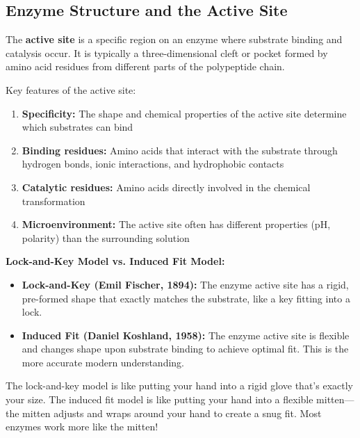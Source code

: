 \subsection{Enzyme Structure and the Active Site}

\begin{definition}
The \textbf{active site} is a specific region on an enzyme where substrate binding and catalysis occur. It is typically a three-dimensional cleft or pocket formed by amino acid residues from different parts of the polypeptide chain.
\end{definition}

Key features of the active site:
\begin{enumerate}
    \item \textbf{Specificity:} The shape and chemical properties of the active site determine which substrates can bind
    \item \textbf{Binding residues:} Amino acids that interact with the substrate through hydrogen bonds, ionic interactions, and hydrophobic contacts
    \item \textbf{Catalytic residues:} Amino acids directly involved in the chemical transformation
    \item \textbf{Microenvironment:} The active site often has different properties (pH, polarity) than the surrounding solution
\end{enumerate}

\begin{theorem}
\textbf{Lock-and-Key Model vs. Induced Fit Model:}
\begin{itemize}
    \item \textbf{Lock-and-Key (Emil Fischer, 1894):} The enzyme active site has a rigid, pre-formed shape that exactly matches the substrate, like a key fitting into a lock.
    \item \textbf{Induced Fit (Daniel Koshland, 1958):} The enzyme active site is flexible and changes shape upon substrate binding to achieve optimal fit. This is the more accurate modern understanding.
\end{itemize}
\end{theorem}

\begin{analogy}
The lock-and-key model is like putting your hand into a rigid glove that's exactly your size. The induced fit model is like putting your hand into a flexible mitten---the mitten adjusts and wraps around your hand to create a snug fit. Most enzymes work more like the mitten!
\end{analogy}

